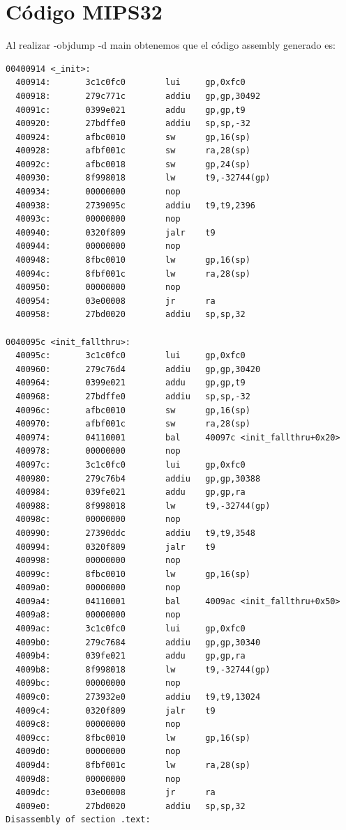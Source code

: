 \documentclass[11pt]{article}
\begin{document}
    \section*{Código MIPS32}
    Al realizar -objdump -d main obtenemos que el código assembly generado es:
    \begin{verbatim}
00400914 <_init>:
  400914:       3c1c0fc0        lui     gp,0xfc0
  400918:       279c771c        addiu   gp,gp,30492
  40091c:       0399e021        addu    gp,gp,t9
  400920:       27bdffe0        addiu   sp,sp,-32
  400924:       afbc0010        sw      gp,16(sp)
  400928:       afbf001c        sw      ra,28(sp)
  40092c:       afbc0018        sw      gp,24(sp)
  400930:       8f998018        lw      t9,-32744(gp)
  400934:       00000000        nop
  400938:       2739095c        addiu   t9,t9,2396
  40093c:       00000000        nop
  400940:       0320f809        jalr    t9
  400944:       00000000        nop
  400948:       8fbc0010        lw      gp,16(sp)
  40094c:       8fbf001c        lw      ra,28(sp)
  400950:       00000000        nop
  400954:       03e00008        jr      ra
  400958:       27bd0020        addiu   sp,sp,32

0040095c <init_fallthru>:
  40095c:       3c1c0fc0        lui     gp,0xfc0
  400960:       279c76d4        addiu   gp,gp,30420
  400964:       0399e021        addu    gp,gp,t9
  400968:       27bdffe0        addiu   sp,sp,-32
  40096c:       afbc0010        sw      gp,16(sp)
  400970:       afbf001c        sw      ra,28(sp)
  400974:       04110001        bal     40097c <init_fallthru+0x20>
  400978:       00000000        nop
  40097c:       3c1c0fc0        lui     gp,0xfc0
  400980:       279c76b4        addiu   gp,gp,30388
  400984:       039fe021        addu    gp,gp,ra
  400988:       8f998018        lw      t9,-32744(gp)
  40098c:       00000000        nop
  400990:       27390ddc        addiu   t9,t9,3548
  400994:       0320f809        jalr    t9
  400998:       00000000        nop
  40099c:       8fbc0010        lw      gp,16(sp)
  4009a0:       00000000        nop
  4009a4:       04110001        bal     4009ac <init_fallthru+0x50>
  4009a8:       00000000        nop
  4009ac:       3c1c0fc0        lui     gp,0xfc0
  4009b0:       279c7684        addiu   gp,gp,30340
  4009b4:       039fe021        addu    gp,gp,ra
  4009b8:       8f998018        lw      t9,-32744(gp)
  4009bc:       00000000        nop
  4009c0:       273932e0        addiu   t9,t9,13024
  4009c4:       0320f809        jalr    t9
  4009c8:       00000000        nop
  4009cc:       8fbc0010        lw      gp,16(sp)
  4009d0:       00000000        nop
  4009d4:       8fbf001c        lw      ra,28(sp)
  4009d8:       00000000        nop
  4009dc:       03e00008        jr      ra
  4009e0:       27bd0020        addiu   sp,sp,32
Disassembly of section .text:


\end{verbatim}
\end{document}
